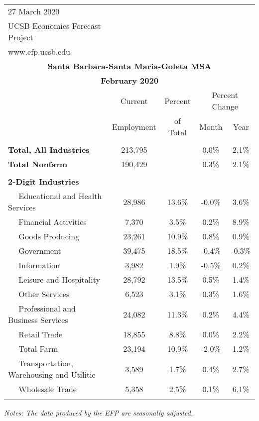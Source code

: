 \documentclass[12pt]{article}
\begin{document}
\begin{landscape}
\begin{table}
\begin{tabular}{|l|c|c|c|c|}
\multicolumn{1}{l}{\small 27 March 2020} & \multicolumn{4}{c}{} \\
\multicolumn{1}{l}{\small UCSB Economics Forecast Project} & \multicolumn{4}{c}{} \\
\multicolumn{1}{l}{\small www.efp.ucsb.edu} & \multicolumn{4}{c}{} \\
\multicolumn{5}{c}{\large \textbf{Santa Barbara-Santa Maria-Goleta MSA}} \\
\multicolumn{5}{c}{\large \textbf{February 2020}} \
\multicolumn{5}{l}{\small Data Seasonally Adjusted} \\ \hline \hline
& Current & Percent & \multicolumn{2}{c}{Percent Change} \vline \\
& Employment & of Total & Month & Year \\ \hline
&&&& \\
\textbf{Total, All Industries} & 213,795 && 0.0\% & 2.1\% \\
\textbf{Total Nonfarm} & 190,429 && 0.3\% & 2.1\% \\
&&&& \\
\textbf{2-Digit Industries} &&&& \\
$\quad$ Educational and Health Services & 28,986 & 13.6\% & -0.0\% & 3.6\% \\
$\quad$ Financial Activities & 7,370 & 3.5\% & 0.2\% & 8.9\% \\
$\quad$ Goods Producing & 23,261 & 10.9\% & 0.8\% & 0.9\% \\
$\quad$ Government & 39,475 & 18.5\% & -0.4\% & -0.3\% \\
$\quad$ Information & 3,982 & 1.9\% & -0.5\% & 0.2\% \\
$\quad$ Leisure and Hospitality & 28,792 & 13.5\% & 0.5\% & 1.4\% \\
$\quad$ Other Services & 6,523 & 3.1\% & 0.3\% & 1.6\% \\
$\quad$ Professional and Business Services & 24,082 & 11.3\% & 0.2\% & 4.4\% \\
$\quad$ Retail Trade & 18,855 & 8.8\% & 0.0\% & 2.2\% \\
$\quad$ Total Farm & 23,194 & 10.9\% & -2.0\% & 1.2\% \\
$\quad$ Transportation, Warehousing and Utilitie & 3,589 & 1.7\% & 0.4\% & 2.7\% \\
$\quad$ Wholesale Trade & 5,358 & 2.5\% & 0.1\% & 6.1\% \\
&&&& \\ \hline \hline
\end{tabular}
\par
\vspace{.5em}
\footnotesize
\textit{Notes: The data produced by the EFP are seasonally adjusted.}
\end{table}
\end{landscape}
\end{document}
